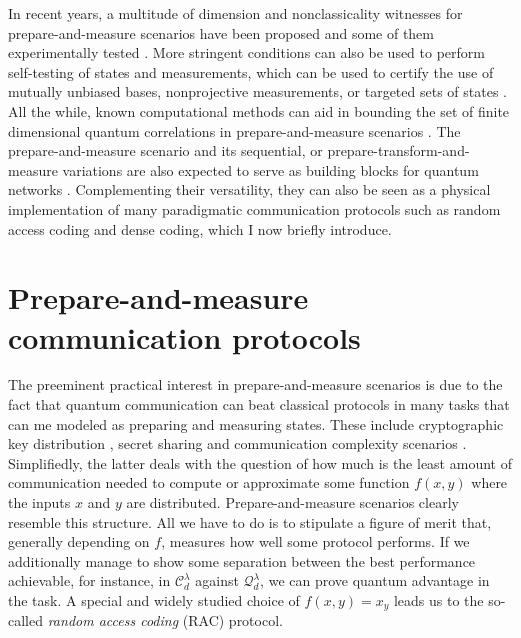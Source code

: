             \ornamentbreak
            
            In recent years, a multitude of dimension and nonclassicality witnesses for prepare-and-measure scenarios have been proposed \cite{gallego_pam_2010,brunner_dimension_2013,sikora_dimension_2016,dallarno_robustness_2012,de_vicente_bound_2019,bowles_certifying_2014,wehner_lower_2008} and some of them experimentally tested \cite{hendrych_experimental_2012,ahrens_experimental_2012,dambrosio_highdimensional_2014}. More stringent conditions can also be used to perform self-testing of states and measurements, which can be used to certify the use of mutually unbiased bases, nonprojective measurements, or targeted sets of states \cite{tavakoli_selftesting_2018,farkas_selftesting_2019,wei_selftesting_2019,mironowicz_fouroutcome_2019,tavakoli_selftesting_2020,miklin_universal_2021,moreno_pamdense_2021}. All the while, known computational methods can aid in bounding the set of finite dimensional quantum correlations in prepare-and-measure scenarios \cite{navascues_bounding_2015,navascues_characterizing_2015}. The prepare-and-measure scenario and its sequential, or prepare-transform-and-measure variations \cite{mohan_sequential_2019,miklin_sequentialunsharp_2020} are also expected to serve as building blocks for quantum networks \cite{bowles_pamnetworks_2015,wang_pamnetworks_2019}. Complementing their versatility, they can also be seen as a physical implementation of many paradigmatic communication protocols such as random access coding and dense coding, which I now briefly introduce.


    \section{Prepare-and-measure communication protocols}
    \label{sec:communication-protocols}

        The preeminent practical interest in prepare-and-measure scenarios is due to the fact that quantum communication can beat classical protocols in many tasks that can me modeled as preparing and measuring states. These include cryptographic key distribution \cite{pawlowski_pamqkd_2011}, secret sharing \cite{schmid_secret_2005} and communication complexity scenarios \cite{buhrman_communicationreview_2010}. Simplifiedly, the latter deals with the question of how much is the least amount of communication needed to compute or approximate some function $f(x,y)$ where the inputs $x$ and $y$ are distributed. Prepare-and-measure scenarios clearly resemble this structure. All we have to do is to stipulate a figure of merit that, generally depending on $f$, measures how well some protocol performs. If we additionally manage to show some separation between the best performance achievable, for instance, in $\mathcal{C}_d^\lambda$ against $\mathcal{Q}_d^\lambda$, we can prove quantum advantage in the task. A special and widely studied choice of $f(x,y) = x_y$ leads us to the so-called \emph{random access coding} (RAC) protocol.

